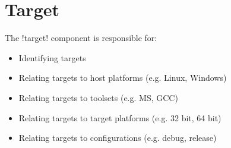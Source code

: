 \section{Target}
\label{sec:share000.cppmake.target}

The !target! component is responsible for:
\begin{itemize}
\item Identifying targets
\item Relating targets to host platforms (e.g. Linux, Windows)
\item Relating targets to toolsets (e.g. MS, GCC)
\item Relating targets to target platforms (e.g. 32 bit, 64 bit)
\item Relating targets to configurations (e.g. debug, release)
\end{itemize}
